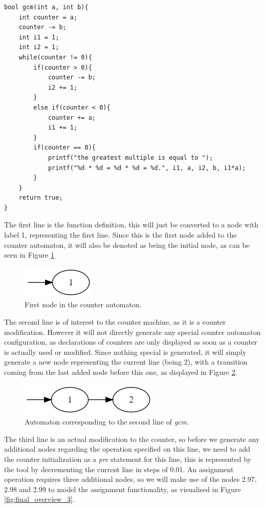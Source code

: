 \documentclass[12pt]{article}
\begin{document}
\begin{lstlisting}[style=CStyle]
bool gcm(int a, int b){
	int counter = a;
	counter -= b;
	int i1 = 1;
	int i2 = 1;
	while(counter != 0){
		if(counter > 0){
			counter -= b;
			i2 += 1;
		}
		else if(counter < 0){
			counter += a;
			i1 += 1;
		}
		if(counter == 0){
			printf("the greatest multiple is equal to ");
			printf("%d * %d = %d * %d = %d.", i1, a, i2, b, i1*a);
		}
	}
	return true;
}
\end{lstlisting}

The first line is the function definition, this will just be converted to a node with label 1, representing the first line. Since this is the first node added to the counter automaton, it will also be denoted as being the initial node, as can be seen in Figure \ref{fig:final_overview_1}

\begin{figure}[h]
	\centering
	\includegraphics[width=0.2\linewidth]{final_overview_1}
	\caption{First node in the counter automaton.}
	\label{fig:final_overview_1}
\end{figure}

The second line is of interest to the counter machine, as it is a counter modification. However it will not directly generate any special counter automaton configuration, as declarations of counters are only displayed as soon as a counter is actually used or modified. Since nothing special is generated, it will simply generate a new node representing the current line (being 2), with a transition coming from the last added node before this one, as displayed in Figure \ref{fig:final_overview_2}.

\begin{figure}[h]
	\centering
	\includegraphics[width=0.4\linewidth]{final_overview_2}
	\caption{Automaton corresponding to the second line of \textit{gcm}.}
	\label{fig:final_overview_2}
\end{figure}

\newpage

The third line is an actual modification to the counter, so before we generate any additional nodes regarding the operation specified on this line, we need to add the counter initialization as a \textit{pre} statement for this line, this is represented by the tool by decrementing the current line in steps of 0.01. An assignment operation requires three additional nodes, so we will make use of the nodes 2.97, 2.98 and 2.99 to model the assignment functionality, as visualised in Figure \ref{fig:final_overview_3}.
\end{document}
